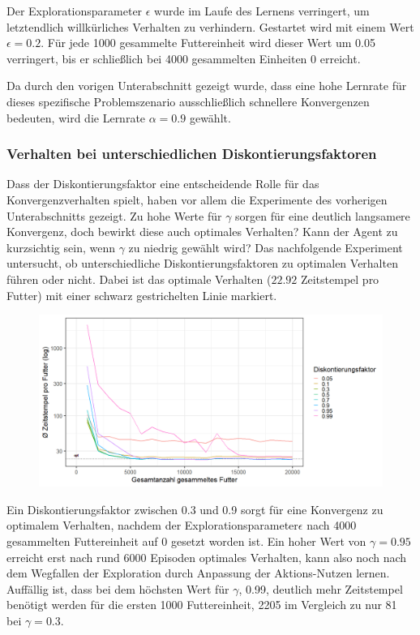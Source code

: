 \par 
Der Explorationsparameter $\epsilon$ wurde im Laufe des Lernens verringert, um letztendlich willkürliches Verhalten zu verhindern. Gestartet wird mit einem Wert $\epsilon = 0.2$. Für jede 1000 gesammelte Futtereinheit wird dieser Wert um 0.05 verringert, bis er schließlich bei 4000 gesammelten Einheiten 0 erreicht. 
\par 
Da durch den vorigen Unterabschnitt gezeigt wurde, dass eine hohe Lernrate für dieses spezifische Problemszenario ausschließlich schnellere Konvergenzen bedeuten, wird die Lernrate $\alpha = 0.9$ gewählt.

\subsubsection*{Verhalten bei unterschiedlichen Diskontierungsfaktoren}
Dass der Diskontierungsfaktor eine entscheidende Rolle für das Konvergenzverhalten spielt, haben vor allem die Experimente des vorherigen Unterabschnitts gezeigt. Zu hohe Werte für $\gamma$ sorgen für eine deutlich langsamere Konvergenz, doch bewirkt diese auch optimales Verhalten? Kann der Agent zu \glqq kurzsichtig\grqq{} sein, wenn $\gamma$ zu niedrig gewählt wird? 
Das nachfolgende Experiment untersucht, ob unterschiedliche Diskontierungsfaktoren zu optimalen Verhalten führen oder nicht. Dabei ist das optimale Verhalten ($22.92$ Zeitstempel pro Futter) mit einer schwarz gestrichelten Linie markiert.
\begin{figure}[H]
    \centering
    \includegraphics[width=\textwidth]{images/optDisc}
    \label{fig:optDisc}
\end{figure}
\newpage
Ein Diskontierungsfaktor zwischen 0.3 und 0.9 sorgt für eine Konvergenz zu optimalem Verhalten, nachdem der Explorationsparameter$\epsilon$ nach 4000 gesammelten Futtereinheit auf 0 gesetzt worden ist. Ein hoher Wert von $\gamma = 0.95$ erreicht erst nach rund 6000 Episoden optimales Verhalten, kann also noch nach dem Wegfallen der Exploration durch Anpassung der Aktions-Nutzen lernen. Auffällig ist, dass bei dem höchsten Wert für $\gamma$, 0.99, deutlich mehr Zeitstempel benötigt werden für die ersten 1000 Futtereinheit, 2205 im Vergleich zu nur 81 bei $\gamma = 0.3$. 
